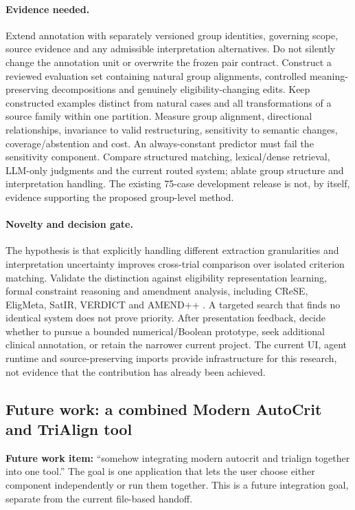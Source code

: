 \documentclass[10pt,letterpaper]{article}
\begin{document}
\paragraph{Evidence needed.}
Extend annotation with separately versioned group identities, governing scope,
source evidence and any admissible interpretation alternatives. Do not silently
change the annotation unit or overwrite the frozen pair contract. Construct a
reviewed evaluation set containing natural group alignments, controlled
meaning-preserving decompositions and genuinely eligibility-changing edits.
Keep constructed examples distinct from natural cases and all transformations
of a source family within one partition. Measure group alignment, directional
relationships, invariance to valid restructuring, sensitivity to semantic changes,
coverage/abstention and cost. An always-constant predictor must fail the
sensitivity component. Compare structured matching, lexical/dense retrieval,
LLM-only judgments and the current routed system; ablate group structure and
interpretation handling. The existing 75-case development release is not, by
itself, evidence supporting the proposed group-level method.

\paragraph{Novelty and decision gate.}
The hypothesis is that explicitly handling different extraction granularities
and interpretation uncertainty improves cross-trial comparison over isolated
criterion matching. Validate the distinction against eligibility representation
learning, formal constraint reasoning and amendment analysis, including
CReSE, EligMeta, SatIR, VERDICT and AMEND++
\cite{crese,eligmeta,satir,verdict,amendpp}. A targeted search that finds no
identical system does not prove priority. After presentation feedback, decide
whether to pursue a bounded numerical/Boolean prototype, seek additional
clinical annotation, or retain the narrower current project. The current UI,
agent runtime and source-preserving imports provide infrastructure for this
research, not evidence that the contribution has already been achieved.

\subsection{Future work: a combined Modern AutoCrit and TriAlign tool}
\label{sec:combinedtool}
\textbf{Future work item:} ``somehow integrating modern autocrit and trialign
together into one tool.'' The goal is one application that lets the user
choose either component independently or run them together. This is a future
integration goal, separate from the current file-based handoff.
\end{document}

